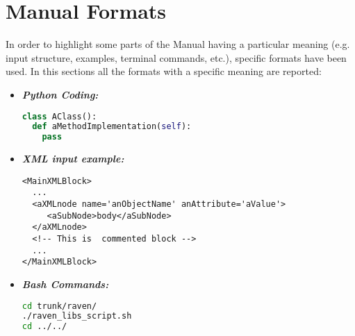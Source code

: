 \section{Manual Formats}
In order to highlight some parts of the Manual having a particular meaning (e.g. input structure, examples, terminal commands, etc.), specific formats have been used. In this sections all the formats with a specific meaning are reported:
\begin{itemize}
\item \textbf{\textit{Python Coding:}}
\begin{lstlisting}[language=python]
class AClass():
  def aMethodImplementation(self):
    pass
\end{lstlisting}
\item \textbf{\textit{XML input example:}}
\begin{lstlisting}[style=XML,morekeywords={anAttribute}]
<MainXMLBlock>
  ...
  <aXMLnode name='anObjectName' anAttribute='aValue'>
     <aSubNode>body</aSubNode>
  </aXMLnode>
  <!-- This is  commented block -->
  ...
</MainXMLBlock>
\end{lstlisting}
\item \textbf{\textit{Bash Commands:}}
\begin{lstlisting}[language=bash]
cd trunk/raven/
./raven_libs_script.sh
cd ../../
\end{lstlisting}
\end{itemize}
 
